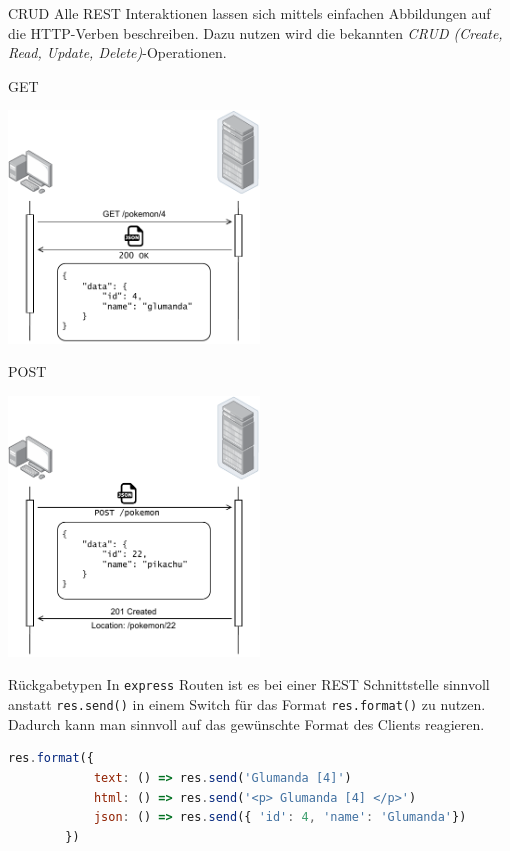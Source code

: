 \begin{defi}{CRUD}
    Alle REST Interaktionen lassen sich mittels einfachen Abbildungen auf die HTTP-Verben beschreiben.
    Dazu nutzen wird die bekannten \emph{CRUD (Create, Read, Update, Delete)}-Operationen.
\end{defi}

\begin{example}{GET}
    \begin{center}
        \includegraphics[width=0.5\textwidth]{includes/figures/example_rest_get.pdf}
    \end{center}
\end{example}

\begin{example}{POST}
    \begin{center}
        \includegraphics[width=0.5\textwidth]{includes/figures/example_rest_post.pdf}
    \end{center}
\end{example}

\begin{bonus}{Rückgabetypen}
    In \texttt{express} Routen ist es bei einer REST Schnittstelle sinnvoll anstatt \texttt{res.send()} in einem Switch für das Format \texttt{res.format()} zu nutzen.
    Dadurch kann man sinnvoll auf das gewünschte Format des Clients reagieren.

    \begin{lstlisting}[language=JavaScript]
        res.format({
            text: () => res.send('Glumanda [4]')
            html: () => res.send('<p> Glumanda [4] </p>')
            json: () => res.send({ 'id': 4, 'name': 'Glumanda'})
        })
    \end{lstlisting}
\end{bonus}

